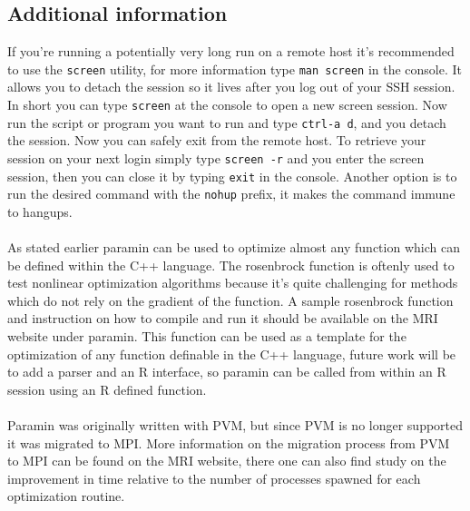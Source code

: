 \documentclass[10pt,twoside]{book}
\begin{document}
\subsection{Additional information}
If you're running a potentially very long run on a remote host it's 
recommended to use the \texttt{screen} utility, for more information type \texttt{man screen} in the console. It allows you to detach the session
so it lives after you log out of your SSH session. In short you can type \texttt{screen} at the console to open a new screen session. Now run the
script or program you want to run and type \texttt{ctrl-a d}, and you detach the session. Now you can safely exit from the remote host. To retrieve
your session on your next login simply type \texttt{screen -r} and you enter the screen session, then you can close it by typing \texttt{exit} in
the console. Another option is to run the desired command with the \texttt{nohup} prefix, it makes the command immune to hangups.\\
\\
As stated earlier paramin can be used to optimize almost any function which can be defined within the C++ language. The rosenbrock function
is oftenly used to test nonlinear optimization algorithms because it's quite challenging for methods which do not rely on the gradient of the function.
A sample rosenbrock function and instruction on how to compile and run it should be available on the MRI website under paramin. This function
can be used as a template for the optimization of any function definable in the C++ language, future work will be to add a parser and an R interface,
so paramin can be called from within an R session using an R defined function.\\
\\
Paramin was originally written with PVM, but since PVM is no longer supported it was migrated to MPI.
More information on the migration process from PVM to MPI can be found on the MRI website, there one can also find study on the improvement in time
relative to the number of processes spawned for each optimization routine.
\end{document}
